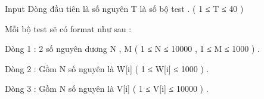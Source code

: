 Input
Dòng đầu tiên là số nguyên T là số bộ test . ( 1 ≤ T ≤ 40 )


Mỗi bộ test sẽ có format như sau :


Dòng 1 : 2 số nguyên dương N , M ( 1 ≤ N ≤ 10000 , 1 ≤ M ≤ 1000 ) .


Dòng 2 : Gồm N số nguyên là W[i] ( 1 ≤ W[i] ≤ 1000 ) .


Dòng 3 : Gồm N số nguyên là V[i] ( 1 ≤ V[i] ≤ 10000 ) .